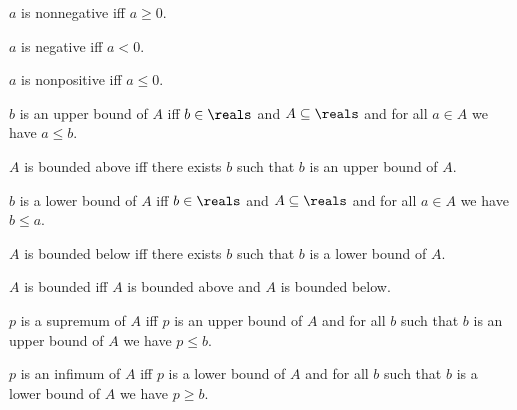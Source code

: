 \begin{abbreviation}\label{real_nonnegative}
    $a$ is nonnegative iff $a \geq 0$.
\end{abbreviation}

\begin{abbreviation}\label{real_negative}
    $a$ is negative iff $a < 0$.
\end{abbreviation}

\begin{abbreviation}\label{real_nonpositive}
    $a$ is nonpositive iff $a \leq 0$.
\end{abbreviation}


\begin{definition}\label{real_upper_bound}
    $b$ is an upper bound of $A$ iff $b\in\reals$ and $A\subseteq\reals$ and for all $a\in A$ we have $a \leq b$.
\end{definition}

\begin{definition}\label{real_bounded_above}
    $A$ is bounded above iff there exists $b$ such that $b$ is an upper bound of $A$.
\end{definition}

\begin{definition}\label{real_lower_bound}
    $b$ is a lower bound of $A$ iff $b\in\reals$ and $A\subseteq\reals$ and for all $a\in A$ we have $b \leq a$.
\end{definition}

\begin{definition}\label{real_bounded_below}
    $A$ is bounded below iff there exists $b$ such that $b$ is a lower bound of $A$.
\end{definition}

\begin{definition}\label{real_bounded}
    $A$ is bounded iff $A$ is bounded above and $A$ is bounded below.
\end{definition}

\begin{definition}\label{real_supremum}
    $p$ is a supremum of $A$ iff $p$ is an upper bound of $A$ and for all $b$ such that $b$ is an upper bound of $A$ we have $p \leq b$.
\end{definition}

\begin{definition}\label{real_infimum}
    $p$ is an infimum of $A$ iff $p$ is a lower bound of $A$ and for all $b$ such that $b$ is a lower bound of $A$ we have $p \geq b$.
\end{definition}

